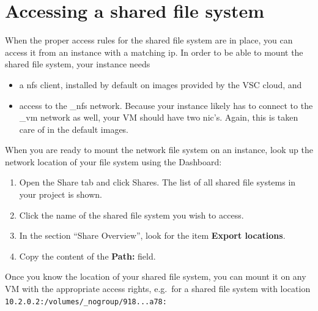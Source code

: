 \section*{Accessing a shared file system}\label{sec:access-shar-file}
When the proper access rules for the shared file system are in place,
you can access it from an instance with a matching ip.  In order to be
able to mount the shared file system, your instance needs
\begin{itemize}
\item a \gls{nfs} client, installed by default on images provided by
  the VSC cloud, and
\item access to the \_nfs network.  Because your instance likely has to
  connect to the \_vm network as well, your VM should have two
  \gls{nic}'s.  Again, this is taken care of in the default images.
\end{itemize}

When you are ready to mount the network file system on an instance,
look up the network location of your file system using the Dashboard:
\begin{enumerate}
\item Open the Share tab and click Shares.  The list of all shared file systems in your project is shown.
\item Click the name of the shared file system you wish to access.
\item In the section ``Share Overview'', look for the item \textbf{Export locations}.
\item Copy the content of the \textbf{Path:} field.
\end{enumerate}

Once you know the location of your shared file system, you can mount
it on any VM with the appropriate access rights, e.g.\ for a shared
file system with location
\lstinline{10.2.0.2:/volumes/_nogroup/918...a78:}

\begin{prompt}
\end{prompt}

